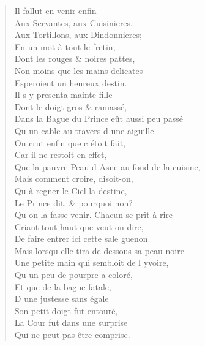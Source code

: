\documentclass[14pt,a4paper]{memoir}
\begin{document}
{{\begin{otherlanguage}{french}
\begin{verse}
\vin Il fallut en venir enfin \\
\vin Aux Servantes, aux Cuisinieres, \\
\vin Aux Tortillons, aux Dindonnieres; \\
\vin En un mot à tout le fretin, \\
\vin Dont les rouges \& noires pattes, \\
\vin Non moins que les mains delicates \\
\vin Esperoient un heureux destin. \\
\vin Il s\textquotesingle{} y presenta mainte fille \\
\vin Dont le doigt gros \& ramassé, \\
Dans la Bague du Prince eût aussi peu passé \\
\vin Qu\textquotesingle{} un cable au travers d\textquotesingle{} une aiguille. \\
\vin On crut enfin que c\textquotesingle{} étoit fait, \\
\vin Car il ne restoit en effet, \\
Que la pauvre Peau d\textquotesingle{} Asne au fond de la cuisine, \\
\vin Mais comment croire, disoit-on, \\
\vin Qu\textquotesingle{} à regner le Ciel la destine, \\
\vin Le Prince dit, \& pourquoi non? \\
Qu\textquotesingle{} on la fasse venir. Chacun se prît à rire \\
Criant tout haut que veut-on dire, \\
De faire entrer ici cette sale guenon \\
Mais lorsqu\textquotesingle{} elle tira de dessous sa peau noire \\
Une petite main qui sembloit de l\textquotesingle{} yvoire, \\
\vin Qu\textquotesingle{} un peu de pourpre a coloré, \\
\vin Et que de la bague fatale, \\
\vin D\textquotesingle{} une justesse sans égale \\
\vin Son petit doigt fut entouré, \\
\vin La Cour fut dans une surprise \\
\vin Qui ne peut pas être comprise.


\end{verse}
\end{otherlanguage}}}
\end{document}
